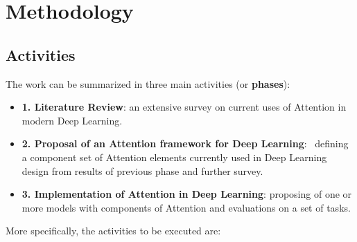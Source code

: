 \documentclass[12pt]{article}
\begin{document}
\let\clearpage\relax

\section{Methodology}
\subsection{Activities}
The work can be summarized in three main activities (or \textbf{phases}):
\begin{itemize}
    \item \textbf{1. Literature Review}: an extensive survey on current uses of Attention in modern
        Deep Learning.
    \item \textbf{2. Proposal of an Attention framework for Deep Learning}: \
        defining a component set of Attention elements currently used in Deep Learning design from results of previous phase and further survey.
    \item \textbf{3. Implementation of Attention in Deep Learning}:
        proposing of one or more models with components of Attention and evaluations on a set of tasks.
\end{itemize}

More specifically, the activities to be executed are:
\end{document}
